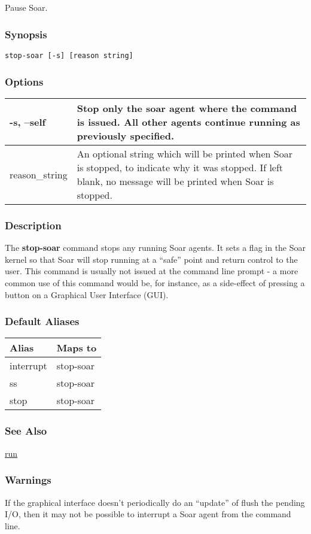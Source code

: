 \subsection{}
\label{stop-soar}
Pause Soar. 
\subsubsection*{Synopsis}
\begin{verbatim}
stop-soar [-s] [reason string]
\end{verbatim}
\subsubsection*{Options}
\begin{tabular}{|l|l|}
\hline 
 -s, --self  & Stop only the soar agent where the command is issued. All other agents continue running as previously specified.  \\
 \hline 
 reason\_string  & An optional string which will be printed when Soar is stopped, to indicate why it was stopped. If left blank, no message will be printed when Soar is stopped.  \\
 \hline 
\end{tabular}
\subsubsection*{Description}
 The \textbf{stop-soar}
 command stops any running Soar agents. It sets a flag in the Soar kernel so that Soar will stop running at a ``safe'' point and return control to the user. This command is usually not issued at the command line prompt - a more common use of this command would be, for instance, as a side-effect of pressing a button on a Graphical User Interface (GUI). 
\subsubsection*{Default Aliases}
\begin{tabular}{|l|l|}
\hline 
 Alias  & Maps to  \\
 \hline 
 interrupt  & stop-soar  \\
 \hline 
 ss  & stop-soar  \\
 \hline 
 stop  & stop-soar  \\
 \hline 
\end{tabular}
\subsubsection*{See Also}
\hyperref[run]{run} \subsubsection*{Warnings}
 If the graphical interface doesn't periodically do an ``update'' of flush the pending I/O, then it may not be possible to interrupt a Soar agent from the command line. 
